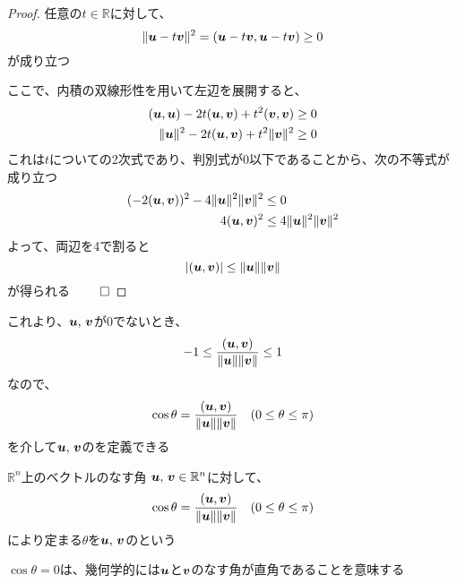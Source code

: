 \documentclass[../../../topic_linear-algebra]{subfiles}
\begin{document}
\begin{proof}
  任意の$t\in \mathbb{R}$に対して、
  \begin{equation*}
    \|\vb*{u} - t\vb*{v}\|^2 = (\vb*{u} - t\vb*{v}, \vb*{u} - t\vb*{v}) \geq 0
  \end{equation*}
  が成り立つ

  ここで、内積の双線形性を用いて左辺を展開すると、
  \begin{align*}
    (\vb*{u}, \vb*{u}) - 2t(\vb*{u}, \vb*{v}) + t^2(\vb*{v}, \vb*{v}) & \geq 0 \\
    \|\vb*{u}\|^2 - 2t(\vb*{u}, \vb*{v}) + t^2\|\vb*{v}\|^2           & \geq 0
  \end{align*}
  これは$t$についての2次式であり、判別式が0以下であることから、次の不等式が成り立つ
  \begin{align*}
    (-2(\vb*{u}, \vb*{v}))^2 - 4\|\vb*{u}\|^2\|\vb*{v}\|^2 & \leq 0                           \\
    4(\vb*{u}, \vb*{v})^2                                  & \leq 4\|\vb*{u}\|^2\|\vb*{v}\|^2
  \end{align*}
  よって、両辺を4で割ると
  \begin{equation*}
    |(\vb*{u}, \vb*{v})| \leq \|\vb*{u}\| \|\vb*{v}\|
  \end{equation*}
  が得られる $\qed$
\end{proof}

これより、$\vb*{u},\,\vb*{v}$が$0$でないとき、
\begin{equation*}
  -1 \leq \frac{(\vb*{u}, \vb*{v})}{\|\vb*{u}\| \|\vb*{v}\|} \leq 1
\end{equation*}
なので、
\begin{equation*}
  \cos \theta = \frac{(\vb*{u}, \vb*{v})}{\|\vb*{u}\| \|\vb*{v}\|} \quad (0 \leq \theta \leq \pi)
\end{equation*}
を介して$\vb*{u},\,\vb*{v}$のを定義できる

\begin{definition}{$\mathbb{R}^n$上のベクトルのなす角}
  $\vb*{u},\,\vb*{v} \in \mathbb{R}^n$に対して、
  \begin{equation*}
    \cos \theta = \frac{(\vb*{u}, \vb*{v})}{\|\vb*{u}\| \|\vb*{v}\|} \quad (0 \leq \theta \leq \pi)
  \end{equation*}
  により定まる$\theta$を$\vb*{u},\,\vb*{v}$のという
\end{definition}

$\cos \theta = 0$は、幾何学的には$\vb*{u}$と$\vb*{v}$のなす角が直角であることを意味する
\end{document}
